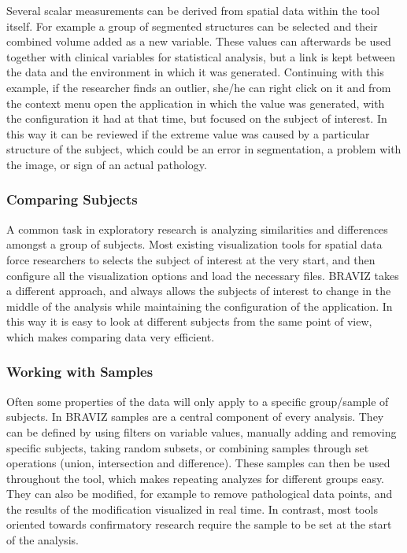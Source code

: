 \documentclass[twocolumn]{svjour3}
\begin{document}
Several scalar measurements can be derived from spatial data within the tool itself. For example a group of segmented structures can be selected and their combined volume added as a new variable. These values can afterwards be used together with clinical variables for statistical analysis, but a link is kept between the data and the environment in which it was generated. Continuing with this example, if the researcher finds an outlier, she/he can right click on it and from the context menu open the application in which the value was generated, with the configuration it had at that time, but focused on the subject of interest. In this way it can be reviewed if the extreme value was caused by a particular structure of the subject, which could be an error in segmentation, a problem with the image, or sign of an actual pathology.

\subsubsection{Comparing Subjects}

A common task in exploratory research is analyzing similarities and differences amongst a group of subjects. Most existing visualization tools for spatial data force researchers to selects the subject of interest at the very start, and then configure all the visualization options and load the necessary files. BRAVIZ takes a different approach, and always allows the subjects of interest to change in the middle of the analysis while maintaining the configuration of the application. In this way it is easy to look at different subjects from the same point of view, which makes comparing data very efficient.  

\subsubsection{Working with Samples}

Often some properties of the data will only apply to a specific group/sample of subjects. In BRAVIZ samples are a central component of every analysis. They can be defined by using filters on variable values, manually adding and removing specific subjects, taking random subsets, or combining samples through set operations (union, intersection and difference). These samples can then be used throughout the tool, which makes repeating analyzes for different groups easy. They can also be modified, for example to remove pathological data points, and the results of the modification visualized in real time. In contrast, most tools oriented towards confirmatory research require the sample to be set at the start of the analysis.
\end{document}

